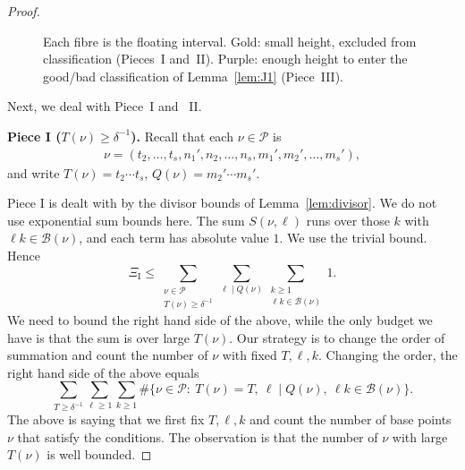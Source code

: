 \begin{proof}
\begin{figure}[ht]
\caption{
 Each fibre is the floating interval.
Gold: small height, excluded from classification
(Pieces~I and~II).  Purple: enough height to enter the good/bad classification
of Lemma~\ref{lem:J1} (Piece~III).}
\label{fig:I1-short}
\end{figure}

Next, we deal with Piece~I and ~II.

\smallskip\noindent\textbf{Piece I ($T(\nu)\geq\delta^{-1}$).}
Recall that each $\nu\in\mathscr P$ is
\begin{align}\label{eq:nu-decomposition}
\nu=(t_2,\ldots,t_s,n_1',n_2,\ldots,n_s,m_1',m_2',\ldots,m_s'),
\end{align}
and write $T(\nu)=t_2\cdots t_s$, $Q(\nu)=m_2'\cdots m_s'$.

Piece I is dealt with by the divisor bounds of Lemma~\ref{lem:divisor}.
We do not use exponential sum bounds here.
The sum $S(\nu,\ell)$ runs over those $k$ with $\ell k\in\mathscr B(\nu)$, and each term has absolute value $1$. We use the trivial bound. Hence
\[
\Xi_{\mathrm I}
\leq
\sum_{\substack{\nu\in\mathscr P\\ T(\nu)\geq\delta^{-1}}}
\sum_{\ell\mid Q(\nu)}
\sum_{\substack{k\geq1\\ \ell k\in\mathscr B(\nu)}}1.
\]
We need to bound the right hand side of the above, while the
only budget we have is that the sum is over large $T(\nu)$.
Our strategy is to change the order of summation and count the number of $\nu$ with fixed $T,\ell,k$.
Changing the order, the right hand side of the above equals
\[
\sum_{T\geq\delta^{-1}}\sum_{\ell\geq1}\sum_{k\geq1}
\#\bigl\{\nu\in\mathscr P:\ T(\nu)=T,\ \ell\mid Q(\nu),\ \ell k\in\mathscr B(\nu)\bigr\}.
\]
The above is saying that we first fix $T,\ell,k$ and count the number of base points $\nu$ that satisfy the conditions.
The observation is that the number of $\nu$ with large $T(\nu)$ is well bounded.


\end{proof}
